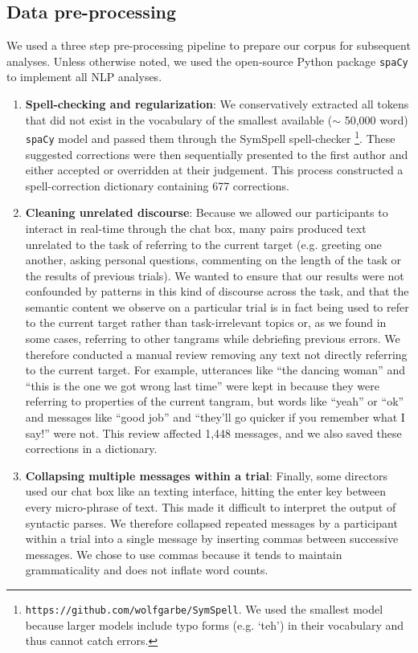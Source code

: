 \documentclass[alpha-refs]{wiley-article}
\begin{document}
\subsection{Data pre-processing}

We used a three step pre-processing pipeline to prepare our corpus for subsequent analyses. Unless otherwise noted, we used the open-source Python package \texttt{spaCy} to implement all NLP analyses. 

\begin{enumerate}

\item \textbf{Spell-checking and regularization}: We conservatively extracted all tokens that did not exist in the vocabulary of the smallest available ($\sim$ 50,000 word) \texttt{spaCy} model and passed them through the SymSpell spell-checker \footnote{\texttt{https://github.com/wolfgarbe/SymSpell}. We used the smallest model because larger models include typo forms (e.g. `teh') in their vocabulary and thus cannot catch errors.}. These suggested corrections were then sequentially presented to the first author and either accepted or overridden at their judgement. This process constructed a spell-correction dictionary containing 677 corrections. 

\item \textbf{Cleaning unrelated discourse}: Because we allowed our participants to interact in real-time through the chat box, many pairs produced text unrelated to the task of referring to the current target (e.g. greeting one another, asking personal questions, commenting on the length of the task or the results of previous trials). We wanted to ensure that our results were not confounded by patterns in this kind of discourse across the task, and that the semantic content we observe on a particular trial is in fact being used to refer to the current target rather than task-irrelevant topics or, as we found in some cases, referring to other tangrams while debriefing previous errors. We therefore conducted a manual review removing any text not directly referring to the current target. For example, utterances like ``the dancing woman'' and ``this is the one we got wrong last time'' were kept in because they were referring to properties of the current tangram, but words like ``yeah'' or ``ok'' and messages like ``good job'' and ``they'll go quicker if you remember what I say!'' were not. This review affected 1,448 messages, and we also saved these corrections in a dictionary. 

\item \textbf{Collapsing multiple messages within a trial}: Finally, some directors used our chat box like an texting interface, hitting the enter key between every micro-phrase of text. This made it difficult to interpret the output of syntactic parses. We therefore collapsed repeated messages by a participant within a trial into a single message by inserting commas between successive messages. We chose to use commas because it tends to maintain grammaticality and does not inflate word counts.

\end{enumerate}
\end{document}
